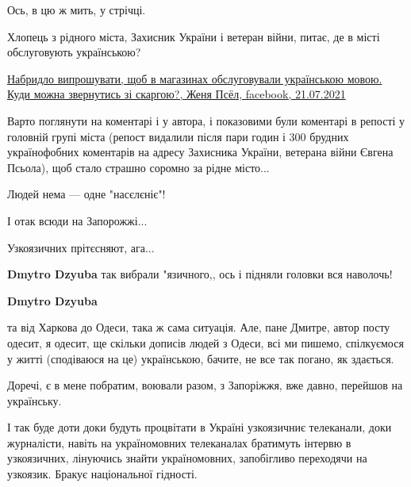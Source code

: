 \begin{itemize}
\begin{itemize}
Ось, в цю ж мить, у стрічці.

Хлопець з рідного міста, Захисник України і ветеран війни, питає, де в місті обслуговують українською?

\href{https://www.facebook.com/permalink.php?story_fbid=2588326674810356&id=100008991462234}{%
Набридло випрошувати, щоб в магазинах обслуговували українською мовою. Куди можна звернутись зі скаргою?,%
Женя Псёл, facebook, 21.07.2021%
}

Варто поглянути на коментарі і у автора, і показовими були коментарі в репості
у головній групі міста (репост видалили після пари годин і 300 брудних
українофобних коментарів на адресу Захисника України, ветерана війни Євгена
Псьола), щоб стало страшно соромно за рідне місто...

Людей нема — одне "насєлєніє"!

І отак всюди на Запорожжі...

Узкоязичних прітєсняют, ага...

 
\textbf{Dmytro Dzyuba} так вибрали "язичного,, ось і підняли головки вся наволочь!

 
\textbf{Dmytro Dzyuba} 

та від Харкова до Одеси, така ж сама ситуація. Але, пане Дмитре, автор посту
одесит, я одесит, ще скільки дописів людей з Одеси, всі ми пишемо, спілкуємося
у житті (сподіваюся на це) українською, бачите, не все так погано, як здається.

Доречі, є в мене побратим, воювали разом, з Запоріжжя, вже давно, перейшов на
українську.


 

І так буде доти доки будуть процвітати в Україні узкоязичниє телеканали, доки
журналісти, навіть на україномовних телеканалах братимуть інтервю в
узкоязичних, лінуючись знайти україномовних, запобігливо переходячи на
узкоязик. Бракує національної гідності.


\end{itemize}
\end{itemize}
